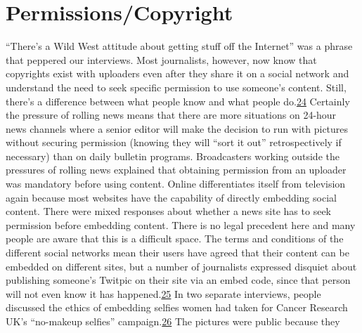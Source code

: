 \documentclass[symmetric, notoc, nobib]{towcenter-book}
\begin{document}
\chapter{Permissions/Copyright}
``There's a Wild West attitude about getting stuff off the Internet'' was a
phrase that peppered our interviews. Most journalists, however, now know
that copyrights exist with uploaders even after they share it on a social network
and understand the need to seek specific permission to use someone's
content. Still, there's a difference between what people know and what
people do.{\href{#endnotes}{24}}
Certainly the pressure of rolling news means that there are more situations
on 24-hour news channels where a senior editor will make the decision to
run with pictures without securing permission (knowing they will ``sort it
out'' retrospectively if necessary) than on daily bulletin programs. Broadcasters
working outside the pressures of rolling news explained that obtaining
permission from an uploader was mandatory before using content.
Online differentiates itself from television again because most websites
have the capability of directly embedding social content. There were mixed
responses about whether a news site has to seek permission before embedding
content. There is no legal precedent here and many people are aware
that this is a difficult space. The terms and conditions of the different social
networks mean their users have agreed that their content can be embedded
on different sites, but a number of journalists expressed disquiet about publishing
someone's Twitpic on their site via an embed code, since that person
will not even know it has happened.{\href{#endnotes}{25}} In two separate interviews, people discussed
the ethics of embedding selfies women had taken for Cancer Research
UK's ``no-makeup selfies'' campaign.{\href{#endnotes}{26}} The pictures were public because they
\end{document}
